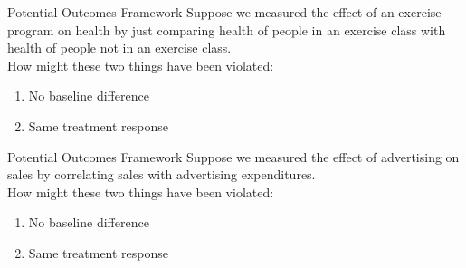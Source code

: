 \documentclass[11pt,handout]{beamer}
\begin{document}
\begin{frame}[c]{Potential Outcomes Framework}
Suppose we measured the effect of an exercise program on health by just comparing health of people in an exercise class with health of people not in an exercise class. \\
How might these two things have been violated:
\begin{enumerate}
  \item No baseline difference
  \item Same treatment response
\end{enumerate}
\end{frame}


\begin{frame}[c]{Potential Outcomes Framework}
Suppose we measured the effect of advertising on sales by correlating sales with advertising expenditures. \\

How might these two things have been violated:
  \begin{enumerate}
    \item No baseline difference
    \item Same treatment response
  \end{enumerate}
\end{frame}
\end{document}
